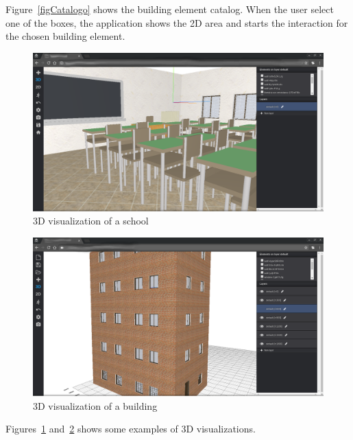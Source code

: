 Figure~\ref{figCatalogo} shows the building element catalog. When the user select one of the boxes, the application shows the 2D area and starts the interaction for the chosen building element.

\begin{figure}[htb]
\centering
\includegraphics[width=\linewidth]{contents/images/3d-school}
\caption{3D visualization of a school}
\label{fig3D-school}
\end{figure}

\begin{figure}[htb]
\centering
\includegraphics[width=\linewidth]{contents/images/palazzo2}
\caption{3D visualization of a building}
\label{fig3D-palace}
\end{figure}

Figures~\ref{fig3D-school} and~\ref{fig3D-palace} shows some examples of 3D visualizations.
